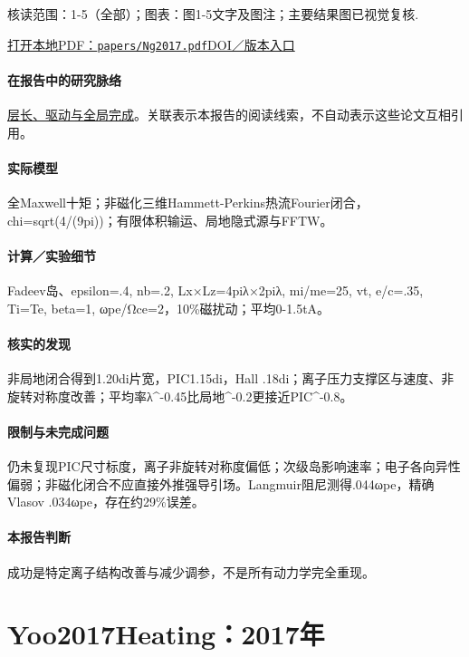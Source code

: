 \textsf{核读范围：}1-5（全部）；\textsf{图表：}图1-5文字及图注；主要结果图已视觉复核.

\href{run:papers/Ng2017.pdf}{打开本地PDF：\texttt{papers/Ng2017.pdf}}\quad\href{https://doi.org/10.1063/1.4993195}{DOI／版本入口}

\paragraph{在报告中的研究脉络}\hyperref[story:global]{层长、驱动与全局完成}。关联表示本报告的阅读线索，不自动表示这些论文互相引用。

\paragraph{实际模型}全Maxwell十矩；非磁化三维Hammett-Perkins热流Fourier闭合，chi=sqrt(4/(9pi))；有限体积输运、局地隐式源与FFTW。

\paragraph{计算／实验细节}Fadeev岛、epsilon=.4, nb=.2, Lx×Lz=4piλ×2piλ, mi/me=25, vt, e/c=.35, Ti=Te, beta=1, ωpe/Ωce=2，10\%磁扰动；平均0-1.5tA。

\paragraph{核实的发现}非局地闭合得到1.20di片宽，PIC1.15di，Hall .18di；离子压力支撑区与速度、非旋转对称度改善；平均率λ\textasciicircum{}-0.45比局地\textasciicircum{}-0.2更接近PIC\textasciicircum{}-0.8。

\paragraph{限制与未完成问题}仍未复现PIC尺寸标度，离子非旋转对称度偏低；次级岛影响速率；电子各向异性偏弱；非磁化闭合不应直接外推强导引场。Langmuir阻尼测得.044ωpe，精确Vlasov .034ωpe，存在约29\%误差。

\paragraph{本报告判断}成功是特定离子结构改善与减少调参，不是所有动力学完全重现。

\section{Yoo2017Heating：2017年}\label{paper:Yoo2017Heating}

